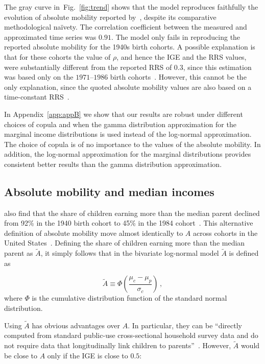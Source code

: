 \documentclass[12pt,a4paper]{article}
\newcommand{\elabel}[1]{\label{eq:#1}}
\newcommand{\fref}[1]{Fig.~\ref{fig:#1}}
\newcommand{\be}{\begin{equation}}
\newcommand{\ee}{\end{equation}}
\numberwithin{equation}{section}
\begin{document}
The gray curve in~\fref{trend} shows that the model reproduces faithfully the evolution of absolute mobility reported by~\citet{chetty2017fading}, despite its comparative methodological na\"{i}vety. The correlation coefficient between the measured and approximated time series was $0.91$. The model only fails in reproducing the reported absolute mobility for the 1940s birth cohorts. A possible explanation is that for these cohorts the value of $\rho$, and hence the IGE and the RRS values, were substantially different from the reported RRS of $0.3$, since this estimation was based only on the $1971$--$1986$ birth cohorts~\citep{chetty2014united}. However, this cannot be the only explanation, since the quoted absolute mobility values are also based on a time-constant RRS~\citep{chetty2017fading}.

In Appendix~\ref{app:appB} we show that our results are robust under different choices of copula and when the gamma distribution approximation for the marginal income distributions is used instead of the log-normal approximation. The choice of copula is of no importance to the values of the absolute mobility. In addition, the log-normal approximation for the marginal distributions provides consistent better results than the gamma distribution approximation.

\subsection{Absolute mobility and median incomes}

\citet{chetty2017fading} also find that the share of children earning more than the median parent declined from 92\% in the 1940 birth cohort to 45\% in the 1984 cohort~\citep{katz2017documenting}. This alternative definition of absolute mobility move almost identically to $A$ across cohorts in the United States~\citep{katz2017documenting}. Defining the share of children earning more than the median parent as $\tilde{A}$, it simply follows that in the bivariate log-normal model $\tilde{A}$ is defined as

\be
\tilde{A} \equiv \Phi\left(\frac{\mu_c-\mu_p}{\sigma_c} \right)\,,
\elabel{tildeA}
\ee
where $\Phi$ is the cumulative distribution function of the standard normal distribution.

Using $\tilde{A}$ has obvious advantages over $A$. In particular, they can be ``directly computed from standard public-use cross-sectional household survey data and do not require data that longitudinally link children to parents''~\citep[p.~382]{katz2017documenting}. However, $\tilde{A}$ would be close to $A$ only if the IGE is close to $0.5$:
\end{document}
